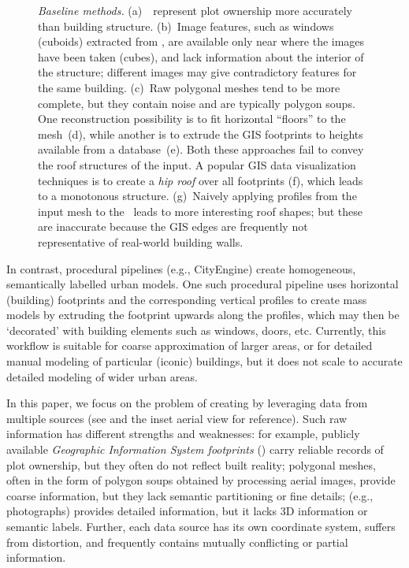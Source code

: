 \begin{figure}[t!]
    \centering
  \def\svgwidth{\linewidth}  
    
  \caption{{\it Baseline methods.} (a)~\GISds\ represent plot ownership more accurately than building structure. (b)~Image features, such as windows (cuboids) extracted from \streetI, are available only near where the images have been taken (cubes), and lack information about the interior of the structure; different images may give contradictory features for the same building. (c)~Raw polygonal meshes tend to be more complete, but they contain noise and are typically polygon soups. One reconstruction possibility is to fit horizontal ``floors'' to the mesh~(d), while another is to extrude the GIS footprints to heights available from a database~(e). Both these approaches fail to convey the roof structures of the input. A popular GIS data visualization techniques is to create a \emph{hip roof} over all footprints (f), which leads to a monotonous structure. (g)~Naively applying profiles from the input mesh to the \GISds\ leads to more interesting roof shapes; but these are inaccurate because the GIS edges are frequently not representative of real-world building walls.}
  \label{fig:baseline_motivation}
  \vnudge
\end{figure}


In contrast, procedural pipelines (e.g., CityEngine) create homogeneous, semantically labelled urban models. 
One such procedural pipeline uses horizontal (building) footprints and the corresponding vertical profiles to create mass models by extruding the footprint upwards along the profiles, which may then be `decorated' with building elements such as windows, doors, etc.
Currently, this workflow is suitable for coarse approximation of larger areas, or for detailed manual modeling of particular (iconic) buildings, but it does not scale to accurate detailed modeling of wider urban areas.

In this paper, we focus on the problem of  creating \outputMs by leveraging data from multiple sources (see  and the inset aerial view for reference).
Such raw information has different strengths and weaknesses: for example, 
publicly available \emph{Geographic Information System footprints} (\GISds) carry reliable records of plot ownership, but they often do not reflect built reality; polygonal meshes, often in the form of polygon soups obtained by processing aerial images, provide coarse information, but they lack semantic partitioning or fine details; \streetI (e.g., \facade photographs) provides detailed information, but it lacks 3D information or semantic labels. Further, each data source has its own coordinate system, suffers from distortion, and frequently contains mutually conflicting or partial information. 

